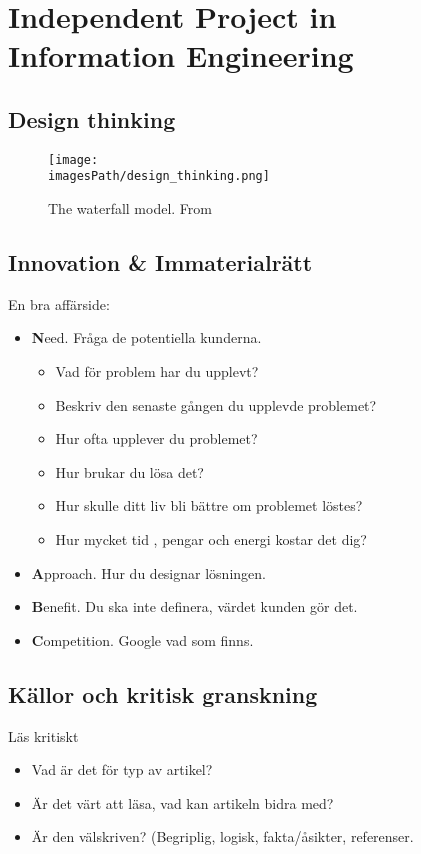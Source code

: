 \chapter{Independent Project in Information Engineering}

\begin{multicols}{2}
\section{Design thinking}
\begin{figure}[H]
    \centering
    \texttt{[image: \\imagesPath/design\_thinking.png]}
    \caption{The waterfall model. From~\cite{ipiie}} %
\end{figure}


\section{Innovation \& Immaterialrätt}
En bra affärside:
\begin{itemize}
\item \textbf{N}eed. Fråga de potentiella kunderna.
  \begin{itemize}
  \item Vad för problem har du upplevt?
  \item Beskriv den senaste gången du upplevde problemet?
  \item Hur ofta upplever du problemet?
  \item Hur brukar du lösa det?
  \item Hur skulle ditt liv bli bättre om problemet löstes?
    \item Hur mycket tid , pengar och energi kostar det dig?
  \end{itemize}
\item \textbf{A}pproach. Hur du designar lösningen.
\item \textbf{B}enefit. Du ska inte definera, värdet kunden gör det.
\item \textbf{C}ompetition. Google vad som finns.
\end{itemize}

\section{Källor och kritisk granskning}
Läs kritiskt
\begin{itemize}
\item Vad är det för typ av artikel?
\item Är det värt att läsa, vad kan artikeln bidra med?
\item Är den välskriven? (Begriplig, logisk, fakta/åsikter, referenser.
\end{itemize}
  

\end{multicols}
